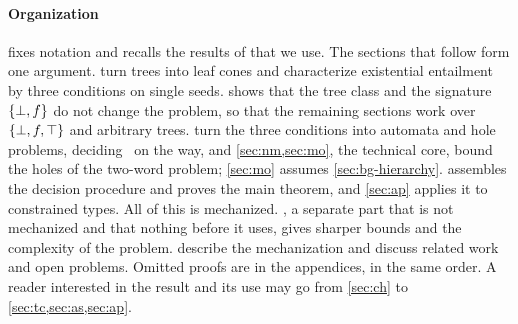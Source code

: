 \paragraph{Organization}
 fixes notation and recalls the results of \citet{Zhao26} that we
use. The sections that follow form one argument.  turn
trees into leaf cones and characterize existential entailment by three
conditions on single seeds.  shows that the tree class and the
signature $\{\bot,f\}$ do not change the problem, so that the remaining sections work
over $\{\bot,f,\top\}$ and arbitrary trees.  turn the three
conditions into automata and hole problems, deciding \CondU\ on the way, and
\cref{sec:nm,sec:mo}, the technical core, bound the holes of the two-word
problem; \cref{sec:mo} assumes \cref{sec:bg-hierarchy}. 
assembles the decision procedure and proves the main theorem, and
\cref{sec:ap} applies it to constrained types. All of this is mechanized.
, a separate part that is not mechanized and that nothing before
it uses, gives sharper bounds and the complexity of the problem.
 describe the mechanization and
discuss related work and open problems. Omitted proofs are in the appendices,
in the same order. A reader interested in the result and its use may go from
\cref{sec:ch} to \cref{sec:tc,sec:as,sec:ap}.
